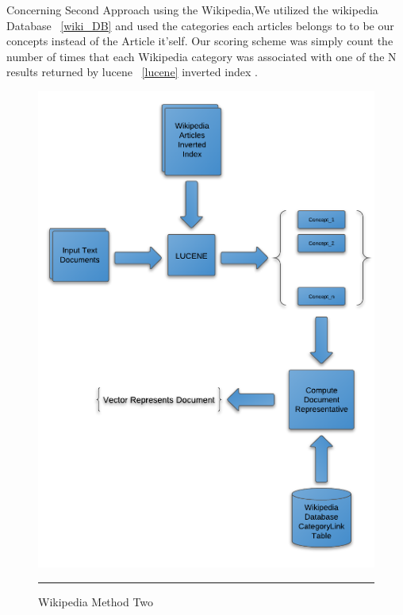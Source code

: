 Concerning Second Approach using the Wikipedia,We utilized the wikipedia Database ~\ref{wiki_DB} and used the categories each articles belongs to to be our concepts instead of the Article it'self. Our scoring scheme was simply count the number of times that each Wikipedia category was associated with one of the N results returned by lucene ~\ref{lucene} inverted index \citep{wiki_2}.
\begin{figure}[htbp]
	\centering
		\includegraphics{./Figures/wiki_2.png}
		\rule{35em}{0.05pt}
	\caption[Wikipedia Method Two]{Wikipedia Method Two}
	\label{fig:Method Two}
\end{figure}

